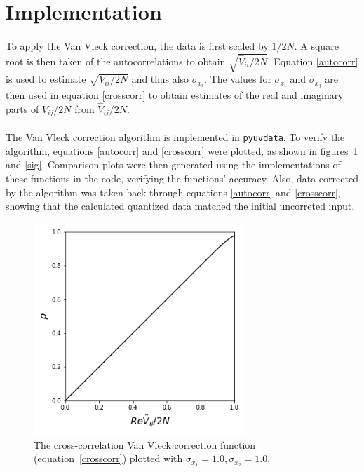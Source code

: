 \documentclass[11pt]{article}
\begin{document}
\section{Implementation}
\paragraph{}To apply the Van Vleck correction, the data is first scaled by $1/2N$. A square root is then taken of the autocorrelations to obtain $\sqrt{\hat V_{ii} / 2N}$. Equation \eqref{autocorr} is used to estimate $\sqrt{V_{ii}/2N}$ and thus also $\sigma_{x_i}$. The values for $\sigma_{x_i}$ and $\sigma_{x_j}$ are then used in equation \eqref{crosscorr} to obtain estimates of the real and imaginary parts of $V_{ij}/2N$ from $\hat V_{ij}/2N$.

\paragraph{}
The Van Vleck correction algorithm is implemented in \texttt{pyuvdata}. To verify the algorithm, equations \eqref{autocorr} and \eqref{crosscorr} were plotted, as shown in figures~\ref{corrplot} and \ref{sig}. Comparison plots were then generated using the implementations of these functions in the code, verifying the functions' accuracy. Also, data corrected by the algorithm was taken back through equations \eqref{autocorr} and \eqref{crosscorr}, showing that the calculated quantized data matched the initial uncorreted input.

\begin{figure}
\centering{}
\includegraphics[width=80mm]{corrtestplot4.png}
\caption{The cross-correlation Van Vleck correction function (equation~\ref{crosscorr}) plotted with $\sigma_{x_1}=1.0, \sigma_{x_2}=1.0$.\label{corrplot}}
\end{figure}
\end{document}
